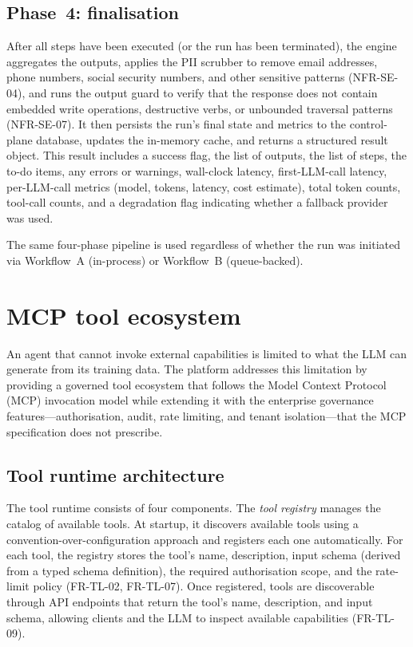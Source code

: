 \documentclass[a4paper]{sapthesis}
\begin{document}
\subsection{Phase~4: finalisation}

After all steps have been executed (or the run has been terminated), the
engine aggregates the outputs, applies the PII scrubber to remove email
addresses, phone numbers, social security numbers, and other sensitive
patterns (NFR-SE-04), and runs the output guard to verify that the
response does not contain embedded write operations, destructive verbs, or
unbounded traversal patterns (NFR-SE-07).  It then persists the run's
final state and metrics to the control-plane database, updates the
in-memory cache, and returns a structured result object.  This result
includes a success flag, the list of outputs, the list of steps, the
to-do items, any errors or warnings, wall-clock latency, first-LLM-call
latency, per-LLM-call metrics (model, tokens, latency, cost estimate),
total token counts, tool-call counts, and a degradation flag indicating
whether a fallback provider was used.

The same four-phase pipeline is used regardless of whether the run was
initiated via Workflow~A (in-process) or Workflow~B (queue-backed).


\section{MCP tool ecosystem}
\label{sec:mcp-tools}

An agent that cannot invoke external capabilities is limited to what the
LLM can generate from its training data.  The platform addresses this
limitation by providing a governed tool ecosystem that follows the Model
Context Protocol (MCP) invocation model while extending it with the
enterprise governance features---authorisation, audit, rate limiting, and
tenant isolation---that the MCP specification does not prescribe.

\subsection{Tool runtime architecture}

The tool runtime consists of four components.  The \emph{tool registry}
manages the catalog of available tools.  At startup, it discovers available tools using a
convention-over-configuration approach and registers each one
automatically.  For each tool, the registry stores the tool's name,
description, input schema (derived from a typed schema definition), the
required authorisation scope, and the rate-limit policy (FR-TL-02,
FR-TL-07).  Once registered, tools are discoverable through API endpoints
that return the tool's name, description, and input schema, allowing
clients and the LLM to inspect available capabilities (FR-TL-09).
\end{document}
